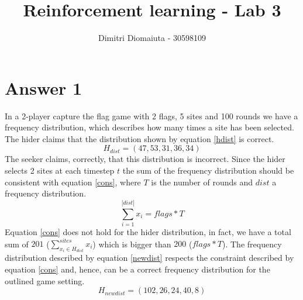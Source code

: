 \documentclass[runningheads]{llncs}
\begin{document}
%
\title{Reinforcement learning - Lab 3}
%
%
\author{Dimitri Diomaiuta - 30598109}
%
%
%
\maketitle              %
%
%
%
%

\section{Answer 1}
In a 2-player capture the flag game with 2 flags, 5 sites and 100
rounds we have a frequency distribution, which describes how many
times a site has been selected. The hider claims that the distribution
shown by equation \ref{hdist} is correct.
\begin{equation}\label{hdist}
H_{dist} = (47, 53, 31, 36, 34)
\end{equation}
The seeker claims, correctly, that this distribution is
incorrect. Since the hider selects 2 sites at each timestep $t$ the
sum of the frequency distribution should be consistent with equation
\ref{cons}, where $T$ is the number of rounds and $dist$ a frequency distribution.
\begin{equation}\label{cons}
  \sum_{i = 1}^{|dist|}x_i = flags * T
\end{equation}
Equation \ref{cons} does not hold for the hider distribution, in fact,
we have a total sum of $201$ ($\sum_{x_i \in H_{dist}}^{sites}x_i$)
which is bigger than $200$ ($flags * T$). The frequency distribution
described by equation \ref{newdist} respects the constraint described
by equation \ref{cons} and, hence, can be a correct frequency
distribution for the outlined game setting.
\begin{equation}\label{newdist}
  H_{newdist} = (102, 26, 24, 40, 8)
\end{equation}
\end{document}
